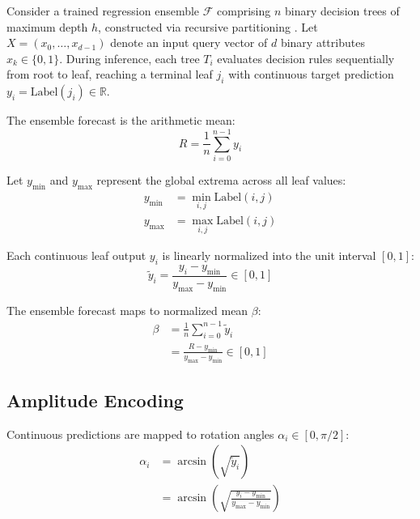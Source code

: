 \documentclass[conference]{IEEEtran}
\begin{document}
Consider a trained regression ensemble $\mathcal{F}$ comprising $n$ binary decision trees of maximum depth $h$, constructed via recursive partitioning \cite{quinlan1986induction}. Let $X = (x_0, \dots, x_{d-1})$ denote an input query vector of $d$ binary attributes $x_k \in \{0, 1\}$. During inference, each tree $T_i$ evaluates decision rules sequentially from root to leaf, reaching a terminal leaf $j_i$ with continuous target prediction $y_i = \text{Label}(j_i) \in \mathbb{R}$.

The ensemble forecast is the arithmetic mean:
\begin{equation}\label{eq2}
R = \frac{1}{n} \sum_{i=0}^{n-1} y_i
\end{equation}

Let $y_{\min}$ and $y_{\max}$ represent the global extrema across all leaf values:
\begin{equation}\label{eq3}
\begin{aligned}
y_{\min} &= \min_{i,j} \text{Label}(i, j) \\
y_{\max} &= \max_{i,j} \text{Label}(i, j)
\end{aligned}
\end{equation}

Each continuous leaf output $y_i$ is linearly normalized into the unit interval $[0, 1]$:
\begin{equation}\label{eq4}
\tilde{y}_i = \frac{y_i - y_{\min}}{y_{\max} - y_{\min}} \in [0, 1]
\end{equation}

The ensemble forecast maps to normalized mean $\beta$:
\begin{equation}\label{eq5}
\begin{aligned}
\beta &= \frac{1}{n} \sum_{i=0}^{n-1} \tilde{y}_i \\
&= \frac{R - y_{\min}}{y_{\max} - y_{\min}} \in [0, 1]
\end{aligned}
\end{equation}

\subsection{Amplitude Encoding}\label{subsec3.2}

Continuous predictions are mapped to rotation angles $\alpha_i \in [0, \pi/2]$:
\begin{equation}\label{eq6}
\begin{aligned}
\alpha_i &= \arcsin\left(\sqrt{\tilde{y}_i}\right) \\
&= \arcsin\left(\sqrt{\frac{y_i - y_{\min}}{y_{\max} - y_{\min}}}\right)
\end{aligned}
\end{equation}
\end{document}
